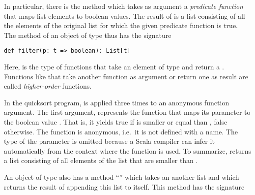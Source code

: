 In particular, there is the method  which takes as
argument a {\em predicate function} that maps list elements to
boolean values. The result of  is a list consisting of
all the elements of the original list for which the given predicate
function is true.  The  method of an object of type
 thus has the signature

\begin{lstlisting}
def filter(p: t => boolean): List[t]
\end{lstlisting}

Here,  is the type of functions that take an element
of type  and return a .  Functions like
 that take another function as argument or return one as
result are called {\em higher-order} functions.

In the quicksort program,  is applied three times to an
anonymous function argument.  The first argument,
 represents the function that maps its parameter
 to the boolean value . That is, it yields
true if  is smaller or equal than , false
otherwise. The function is anonymous, i.e.\ it is not defined with a
name. The type of the  parameter is omitted because a Scala
compiler can infer it automatically from the context where the
function is used. To summarize, 
returns a list consisting of all elements of the list  that are
smaller than .


An object of type  also has a method ``\code{:::}''
which takes an another list and which returns the result of appending this
list to itself. This method has the signature


